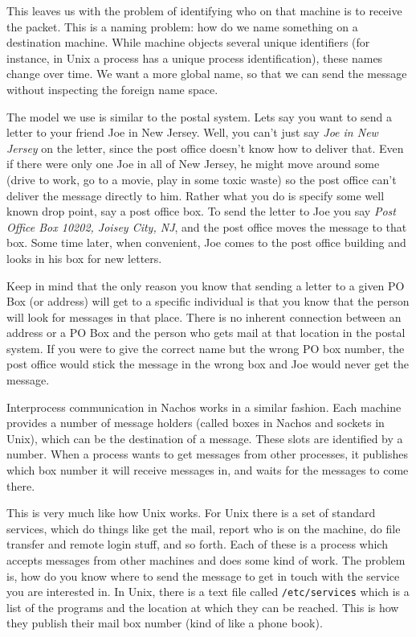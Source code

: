 This leaves us with the problem of identifying who on that
machine is to receive the packet.  This is a naming problem: how do we
name something on a destination machine.  While machine objects
several unique identifiers (for instance, in Unix a process has a
unique process identification), these names change over time.
We want a more global name, so that we can send the message without
inspecting the foreign name space.

The model we use is similar to the postal system.  Lets say you want to
send a letter to your friend Joe in New Jersey.  Well, you
can't just say {\it Joe in New Jersey} on the letter, since the post office
doesn't know how to deliver that.  Even if there were only one Joe in all of
New Jersey, he might move around some (drive to work, go to a movie, play
in some toxic waste) so the post office can't deliver the message directly
to him.  Rather what you do is specify some well known drop point, say
a post office box.  To send the letter to Joe you say
{\it Post Office Box 10202, Joisey City, NJ},
and the post office moves the message to that box.  Some time
later, when convenient, Joe comes to the post office building and looks
in his box for new letters.

Keep in mind that the only reason you know that sending a letter to a given
PO Box (or address) will get to a specific individual is that you know that
the person will look for messages in that place.  There is no inherent
connection between an address or a PO Box and the person who gets mail
at that location in the postal system.  If you were to give the correct
name but the wrong PO box number, the post office would stick the message
in the wrong box and Joe would never get the message.

Interprocess communication in Nachos works in a similar fashion.  Each
machine provides a number of message holders (called boxes in Nachos
and sockets in Unix), which can be the destination of a message.  These
slots are identified by a number.  When a process wants to get messages
from other processes, it publishes which box number it will receive messages
in, and waits for the messages to come there.

This is very much like how Unix works.  For Unix there is a set of standard
services, which do things like get the mail, report who is on the machine,
do file transfer and remote login stuff, and so forth.  Each of these is
a process which accepts messages from other machines and does some kind of
work.  The problem is, how do you know where to send the message to get
in touch with the service you are interested in.  In Unix, there is a
text file called {\tt /etc/services} which is a list of the programs and
the location at which they can be reached.  This is how they publish their
mail box number (kind of like a phone book).

